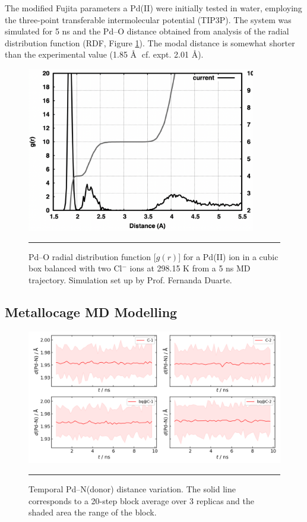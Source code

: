 \documentclass[../../main.tex]{subfiles}
\begin{document}
The modified Fujita parameters a Pd(II) were initially tested in water, employing the three-point transferable intermolecular potential (TIP3P).\cite{Jorgensen1983} The system was simulated for 5 ns and the Pd–O distance obtained from analysis of the radial distribution function (RDF, Figure \ref{fig::si_da_1}). The modal distance is somewhat shorter than the experimental value (1.85 \AA$\;$ cf. expt.\cite{Persson2010} 2.01 \AA).


\begin{figure}[h!]
	\vspace{0.4cm}
	\centering
	\includegraphics[width=10cm]{3/da//figs/figS1}
	\vspace{0.2cm}
	\hrule
	\caption{Pd–O radial distribution function [$g(r)$] for a Pd(II) ion in a cubic box balanced with two Cl$^{-}$ ions at 298.15 K from a 5 ns MD trajectory. Simulation set up by Prof. Fernanda Duarte.}
	\label{fig::si_da_1}
\end{figure}


\subsection{Metallocage MD Modelling}
\label{section::da_si_1_2}

\begin{figure}[h!]
	\vspace{0.4cm}
	\centering
	\includegraphics[width=\textwidth]{3/da//figs/figS2}
	\vspace{0.2cm}
	\hrule
	\caption{Temporal Pd–N(donor) distance variation. The solid line corresponds to a 20-step block average over 3 replicas and the shaded area the range of the block.}
	\label{fig::si_da_2}
\end{figure}
\end{document}
